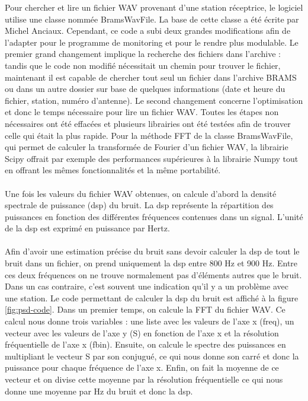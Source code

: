 \documentclass[11pt]{article}
\begin{document}
Pour chercher et lire un fichier WAV provenant d'une station réceptrice, le logiciel utilise une classe nommée BramsWavFile.
La base de cette classe a été écrite par Michel Anciaux.
Cependant, ce code a subi deux grandes modifications afin de l'adapter pour le programme de monitoring et pour le rendre plus modulable.
Le premier grand changement implique la recherche des fichiers dans l'archive : tandis que le code non modifié nécessitait un chemin pour trouver le fichier, maintenant il est capable de chercher tout seul un fichier dans l'archive BRAMS ou dans un autre dossier sur base de quelques informations (date et heure du fichier, station, numéro d'antenne).
Le second changement concerne l'optimisation et donc le temps nécessaire pour lire un fichier WAV.
Toutes les étapes non nécessaires ont été effacées et plusieurs librairies ont été testées afin de trouver celle qui était la plus rapide.
Pour la méthode FFT de la classe BramsWavFile, qui permet de calculer la transformée de Fourier d'un fichier WAV, la librairie Scipy offrait par exemple des performances supérieures à la librairie Numpy tout en offrant les mêmes fonctionnalités et la même portabilité.\\
\\
Une fois les valeurs du fichier WAV obtenues, on calcule d'abord la densité spectrale de puissance (dsp) du bruit.
La dsp représente la répartition des puissances en fonction des différentes fréquences contenues dans un signal.
L'unité de la dsp est exprimé en puissance par Hertz.\\
\\
Afin d'avoir une estimation précise du bruit sans devoir calculer la dsp de tout le bruit dans un fichier, on prend uniquement la dsp entre 800 Hz et 900 Hz.
Entre ces deux fréquences on ne trouve normalement pas d'éléments autres que le bruit.
Dans un cas contraire, c'est souvent une indication qu'il y a un problème avec une station.
Le code permettant de calculer la dsp du bruit est affiché à la figure \ref{fig:psd-code}.
Dans un premier temps, on calcule la FFT du fichier WAV.
Ce calcul nous donne trois variables : une liste avec les valeurs de l'axe x (freq), un vecteur avec les valeurs de l'axe y (S) en fonction de l'axe x et la résolution fréquentielle de l'axe x (fbin).
Ensuite, on calcule le spectre des puissances en multipliant le vecteur S par son conjugué, ce qui nous donne son carré et donc la puissance pour chaque fréquence de l'axe x.
Enfin, on fait la moyenne de ce vecteur et on divise cette moyenne par la résolution fréquentielle ce qui nous donne une moyenne par Hz du bruit et donc la dsp.\\
\end{document}
